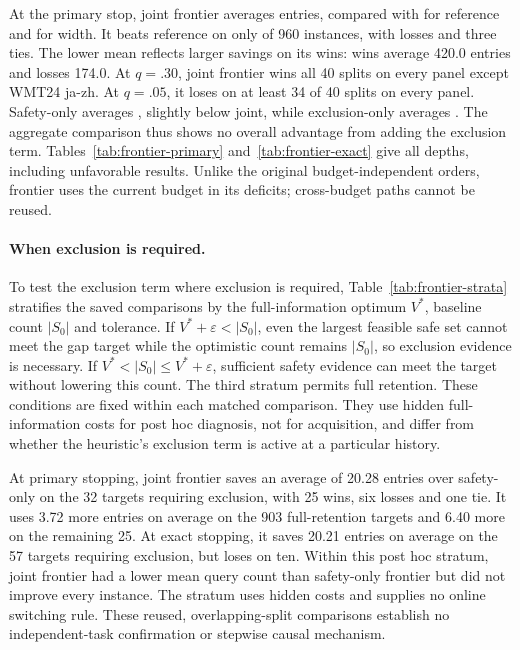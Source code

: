 At the primary stop, joint frontier averages \frontierQueries{} entries, compared with \frontierRefQueries{} for reference and \frontierWidthQueries{} for width. It beats reference on only \frontierWins{} of 960 instances, with \frontierLosses{} losses and three ties. The lower mean reflects larger savings on its wins: wins average 420.0 entries and losses 174.0. At $q=.30$, joint frontier wins all 40 splits on every panel except WMT24 ja-zh. At $q=.05$, it loses on at least 34 of 40 splits on every panel. Safety-only averages \frontierSafetyQueries{}, slightly below joint, while exclusion-only averages \frontierExclusionQueries{}. The aggregate comparison thus shows no overall advantage from adding the exclusion term. Tables~\ref{tab:frontier-primary} and~\ref{tab:frontier-exact} give all depths, including unfavorable results. Unlike the original budget-independent orders, frontier uses the current budget in its deficits; cross-budget paths cannot be reused.

\paragraph{When exclusion is required.}
To test the exclusion term where exclusion is required, Table~\ref{tab:frontier-strata} stratifies the saved comparisons by the full-information optimum $V^*$, baseline count $|S_0|$ and tolerance. If $V^*+\varepsilon<|S_0|$, even the largest feasible safe set cannot meet the gap target while the optimistic count remains $|S_0|$, so exclusion evidence is necessary. If $V^*<|S_0|\le V^*+\varepsilon$, sufficient safety evidence can meet the target without lowering this count. The third stratum permits full retention. These conditions are fixed within each matched comparison. They use hidden full-information costs for post hoc diagnosis, not for acquisition, and differ from whether the heuristic's exclusion term is active at a particular history.

At primary stopping, joint frontier saves an average of 20.28 entries over safety-only on the 32 targets requiring exclusion, with 25 wins, six losses and one tie. It uses 3.72 more entries on average on the 903 full-retention targets and 6.40 more on the remaining 25. At exact stopping, it saves 20.21 entries on average on the 57 targets requiring exclusion, but loses on ten. Within this post hoc stratum, joint frontier had a lower mean query count than safety-only frontier but did not improve every instance. The stratum uses hidden costs and supplies no online switching rule. These reused, overlapping-split comparisons establish no independent-task confirmation or stepwise causal mechanism.

